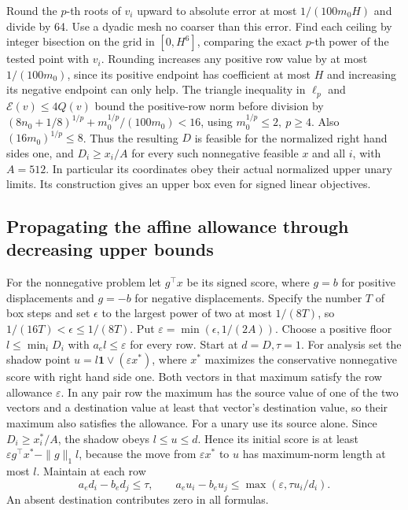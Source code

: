\documentclass[11pt]{article}
\begin{document}
Round the \(p\)-th roots of \(v_i\) upward to absolute error at most \(1/(100m_0H)\) and divide by 64. Use a dyadic mesh no coarser than this error. Find each ceiling by integer bisection on the grid in \([0,H^6]\), comparing the exact \(p\)-th power of the tested point with \(v_i\). Rounding increases any positive row value by at most \(1/(100m_0)\), since its positive endpoint has coefficient at most \(H\) and increasing its negative endpoint can only help. The triangle inequality in \(\ell_p\) and \(\mathcal E(v)\le4Q(v)\) bound the positive-row norm before division by \((8n_0+1/8)^{1/p}+m_0^{1/p}/(100m_0)<16\), using \(m_0^{1/p}\le2,\ p\ge4\). Also \((16m_0)^{1/p}\le8\). Thus the resulting \(D\) is feasible for the normalized right hand sides one, and \(D_i\ge x_i/A\) for every such nonnegative feasible \(x\) and all \(i\), with \(A=512\). In particular its coordinates obey their actual normalized upper unary limits. Its construction gives an upper box even for signed linear objectives.

\hypertarget{propagating-the-affine-allowance-through-decreasing-upper-bounds}{%
\subsection*{Propagating the affine allowance through decreasing upper bounds}\label{propagating-the-affine-allowance-through-decreasing-upper-bounds}}

For the nonnegative problem let \(g^\top x\) be its signed score, where \(g=b\) for positive displacements and \(g=-b\) for negative displacements. Specify the number \(T\) of box steps and set \(\epsilon\) to the largest power of two at most \(1/(8T)\), so \(1/(16T)<\epsilon\le1/(8T)\). Put \(\varepsilon=\min(\epsilon,1/(2A))\). Choose a positive floor \(l\le\min_i D_i\) with \(a_e l\le\varepsilon\) for every row. Start at \(d=D,\tau=1\). For analysis set the shadow point \(u=l\mathbf1\vee(\varepsilon x^*)\), where \(x^*\) maximizes the conservative nonnegative score with right hand side one. Both vectors in that maximum satisfy the row allowance \(\varepsilon\). In any pair row the maximum has the source value of one of the two vectors and a destination value at least that vector's destination value, so their maximum also satisfies the allowance. For a unary use its source alone. Since \(D_i\ge x_i^*/A\), the shadow obeys \(l\le u\le d\). Hence its initial score is at least \(\varepsilon g^\top x^*-\|g\|_1l\), because the move from \(\varepsilon x^*\) to \(u\) has maximum-norm length at most \(l\). Maintain at each row
\[
 a_e d_i-b_e d_j\le\tau,\qquad
 a_e u_i-b_e u_j\le\max(\varepsilon,\tau u_i/d_i).                    \tag{1}
\]
An absent destination contributes zero in all formulas.
\end{document}
